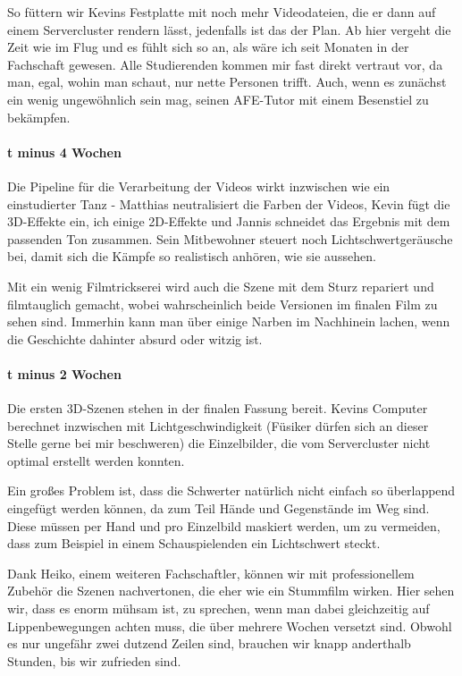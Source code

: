 {    So füttern wir Kevins Festplatte mit noch mehr Videodateien, die er dann auf
    einem Servercluster rendern lässt, jedenfalls ist das der Plan.
    Ab hier vergeht die Zeit wie im Flug und es fühlt sich so an, als wäre ich seit
    Monaten in der Fachschaft gewesen. Alle Studierenden kommen mir fast direkt
    vertraut vor, da man, egal, wohin man schaut, nur nette Personen trifft. Auch,
    wenn es zunächst ein wenig ungewöhnlich sein mag, seinen AFE-Tutor mit einem
    Besenstiel zu bekämpfen.
    \paragraph{t minus 4 Wochen}
    Die Pipeline für die Verarbeitung der Videos wirkt inzwischen wie ein
    einstudierter Tanz - Matthias neutralisiert die Farben der Videos, Kevin fügt
    die 3D-Effekte ein, ich einige 2D-Effekte und Jannis schneidet das Ergebnis mit
    dem passenden Ton zusammen. Sein Mitbewohner steuert noch Lichtschwertgeräusche
    bei, damit sich die Kämpfe so realistisch anhören, wie sie aussehen.


    Mit ein wenig Filmtrickserei wird auch die Szene mit dem Sturz repariert und
    filmtauglich gemacht, wobei wahrscheinlich beide Versionen im finalen Film zu
    sehen sind. Immerhin kann man über einige Narben im Nachhinein lachen, wenn die
    Geschichte dahinter absurd oder witzig ist.


    \paragraph{t minus 2 Wochen}
    Die ersten 3D-Szenen stehen in der finalen Fassung bereit. Kevins Computer
    berechnet inzwischen mit Lichtgeschwindigkeit (Füsiker dürfen sich an dieser
    Stelle gerne bei mir beschweren) die Einzelbilder, die vom Servercluster nicht
    optimal erstellt werden konnten.


    Ein großes Problem ist, dass die Schwerter natürlich nicht einfach so
    überlappend eingefügt werden können, da zum Teil Hände und Gegenstände im Weg
    sind. Diese müssen per Hand und pro Einzelbild maskiert werden, um zu
    vermeiden, dass zum Beispiel in einem Schauspielenden ein Lichtschwert steckt.

    Dank Heiko, einem weiteren Fachschaftler, können wir mit professionellem
    Zubehör die Szenen nachvertonen, die eher wie ein Stummfilm wirken. Hier sehen
    wir, dass es enorm mühsam ist, zu sprechen, wenn man dabei gleichzeitig
    auf Lippenbewegungen achten muss, die über mehrere Wochen versetzt sind. Obwohl
    es nur ungefähr zwei dutzend Zeilen sind, brauchen wir knapp anderthalb
    Stunden, bis wir zufrieden sind.
}
